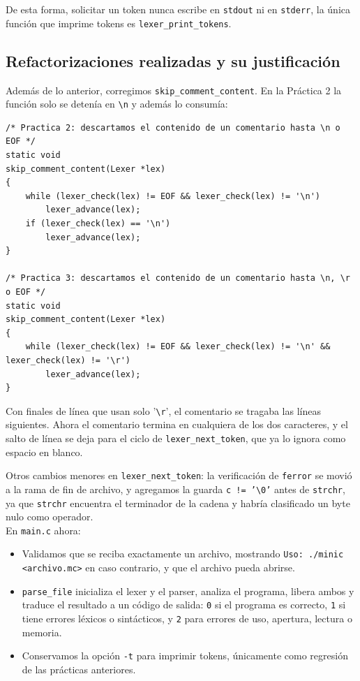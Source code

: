 \documentclass[12pt,letterpaper]{article}
\begin{document}
De esta forma, solicitar un token nunca escribe en \texttt{stdout} ni en \texttt{stderr}, la única función que
imprime tokens es \texttt{lexer\_print\_tokens}.

\subsection*{Refactorizaciones realizadas y su justificación}

Además de lo anterior, corregimos \texttt{skip\_comment\_content}. En la Práctica 2 la función solo se
detenía en \texttt{\textbackslash n} y además lo consumía:

\begin{lstlisting}[style=modernc, caption={\texttt{skip\_comment\_content} en la Práctica 2 y en la Práctica 3.}]
/* Practica 2: descartamos el contenido de un comentario hasta \n o EOF */
static void
skip_comment_content(Lexer *lex)
{
    while (lexer_check(lex) != EOF && lexer_check(lex) != '\n')
        lexer_advance(lex);
    if (lexer_check(lex) == '\n')
        lexer_advance(lex);
}

/* Practica 3: descartamos el contenido de un comentario hasta \n, \r o EOF */
static void
skip_comment_content(Lexer *lex)
{
    while (lexer_check(lex) != EOF && lexer_check(lex) != '\n' && lexer_check(lex) != '\r')
        lexer_advance(lex);
}
\end{lstlisting}

\bigskip

Con finales de línea que usan solo '\texttt{\textbackslash r}', el comentario se tragaba las líneas
siguientes. Ahora el comentario termina en cualquiera de los dos caracteres, y el salto de línea se deja para
el ciclo de \texttt{lexer\_next\_token}, que ya lo ignora como espacio en blanco.

Otros cambios menores en \texttt{lexer\_next\_token}: la verificación de \texttt{ferror} se movió a la rama de
fin de archivo, y agregamos la guarda \texttt{c != '\textbackslash 0'} antes de \texttt{strchr}, ya que
\texttt{strchr} encuentra el terminador de la cadena y habría clasificado un byte nulo como operador.\\

En \texttt{main.c} ahora:

\begin{itemize}
\item Validamos que se reciba exactamente un archivo, mostrando \texttt{Uso: ./minic <archivo.mc>} en caso
  contrario, y que el archivo pueda abrirse.
\item \texttt{parse\_file} inicializa el lexer y el parser, analiza el programa, libera ambos y traduce el
  resultado a un código de salida: \texttt{0} si el programa es correcto, \texttt{1} si tiene errores léxicos
  o sintácticos, y \texttt{2} para errores de uso, apertura, lectura o memoria.
\item Conservamos la opción \texttt{-t} para imprimir tokens, únicamente como regresión de las prácticas
  anteriores.
\end{itemize}
\end{document}
